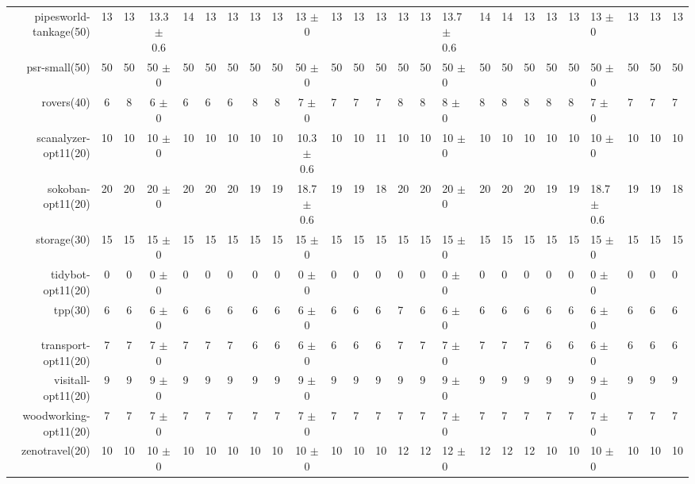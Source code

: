 \begin{center}
\begin{tabular}{|r|cccHHH|cccHHHHHHHHHHHHHHH|}
pipesworld-tankage(50) & 13 & 13 & 13.3 $\pm$ 0.6 & 14 & 13 & 13 & 13 & 13 & 13 $\pm$ 0 & 13 & 13 & 13 & 13 & 13 & 13.7 $\pm$ 0.6 & 14 & 14 & 13 & 13 & 13 & 13 $\pm$ 0 & 13 & 13 & 13\\
psr-small(50) & 50 & 50 & 50 $\pm$ 0 & 50 & 50 & 50 & 50 & 50 & 50 $\pm$ 0 & 50 & 50 & 50 & 50 & 50 & 50 $\pm$ 0 & 50 & 50 & 50 & 50 & 50 & 50 $\pm$ 0 & 50 & 50 & 50\\
rovers(40) & 6 & 8 & 6 $\pm$ 0 & 6 & 6 & 6 & 8 & 8 & 7 $\pm$ 0 & 7 & 7 & 7 & 8 & 8 & 8 $\pm$ 0 & 8 & 8 & 8 & 8 & 8 & 7 $\pm$ 0 & 7 & 7 & 7\\
scanalyzer-opt11(20) & 10 & 10 & 10 $\pm$ 0 & 10 & 10 & 10 & 10 & 10 & 10.3 $\pm$ 0.6 & 10 & 10 & 11 & 10 & 10 & 10 $\pm$ 0 & 10 & 10 & 10 & 10 & 10 & 10 $\pm$ 0 & 10 & 10 & 10\\
sokoban-opt11(20) & 20 & 20 & 20 $\pm$ 0 & 20 & 20 & 20 & 19 & 19 & 18.7 $\pm$ 0.6 & 19 & 19 & 18 & 20 & 20 & 20 $\pm$ 0 & 20 & 20 & 20 & 19 & 19 & 18.7 $\pm$ 0.6 & 19 & 19 & 18\\
storage(30) & 15 & 15 & 15 $\pm$ 0 & 15 & 15 & 15 & 15 & 15 & 15 $\pm$ 0 & 15 & 15 & 15 & 15 & 15 & 15 $\pm$ 0 & 15 & 15 & 15 & 15 & 15 & 15 $\pm$ 0 & 15 & 15 & 15\\
tidybot-opt11(20) & 0 & 0 & 0 $\pm$ 0 & 0 & 0 & 0 & 0 & 0 & 0 $\pm$ 0 & 0 & 0 & 0 & 0 & 0 & 0 $\pm$ 0 & 0 & 0 & 0 & 0 & 0 & 0 $\pm$ 0 & 0 & 0 & 0\\
tpp(30) & 6 & 6 & 6 $\pm$ 0 & 6 & 6 & 6 & 6 & 6 & 6 $\pm$ 0 & 6 & 6 & 6 & 7 & 6 & 6 $\pm$ 0 & 6 & 6 & 6 & 6 & 6 & 6 $\pm$ 0 & 6 & 6 & 6\\
transport-opt11(20) & 7 & 7 & 7 $\pm$ 0 & 7 & 7 & 7 & 6 & 6 & 6 $\pm$ 0 & 6 & 6 & 6 & 7 & 7 & 7 $\pm$ 0 & 7 & 7 & 7 & 6 & 6 & 6 $\pm$ 0 & 6 & 6 & 6\\
visitall-opt11(20) & 9 & 9 & 9 $\pm$ 0 & 9 & 9 & 9 & 9 & 9 & 9 $\pm$ 0 & 9 & 9 & 9 & 9 & 9 & 9 $\pm$ 0 & 9 & 9 & 9 & 9 & 9 & 9 $\pm$ 0 & 9 & 9 & 9\\
woodworking-opt11(20) & 7 & 7 & 7 $\pm$ 0 & 7 & 7 & 7 & 7 & 7 & 7 $\pm$ 0 & 7 & 7 & 7 & 7 & 7 & 7 $\pm$ 0 & 7 & 7 & 7 & 7 & 7 & 7 $\pm$ 0 & 7 & 7 & 7\\
zenotravel(20) & 10 & 10 & 10 $\pm$ 0 & 10 & 10 & 10 & 10 & 10 & 10 $\pm$ 0 & 10 & 10 & 10 & 12 & 12 & 12 $\pm$ 0 & 12 & 12 & 12 & 10 & 10 & 10 $\pm$ 0 & 10 & 10 & 10\\
\hline
\end{tabular}
\end{center}
